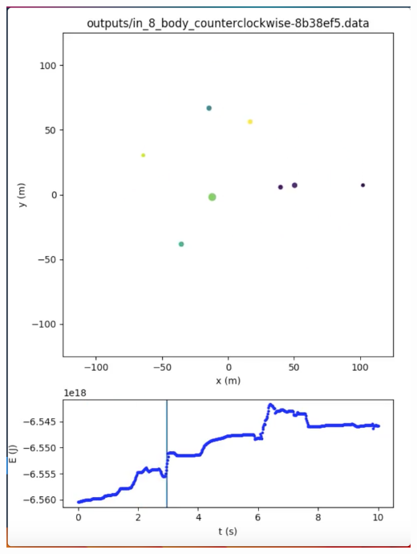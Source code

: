 \documentclass{beamer}
\begin{document}
\includegraphics[width=\textwidth]{barnes_hut}

\framebreak
\end{document}
